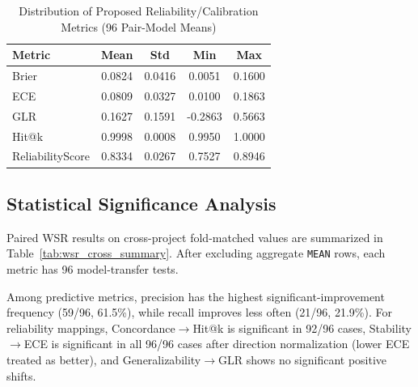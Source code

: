 \documentclass[conference]{IEEEtran}
\begin{document}
\begin{table}[t]
\caption{Distribution of Proposed Reliability/Calibration Metrics (96 Pair-Model Means)}
\label{tab:reliability_dist}
\centering
\footnotesize
\setlength{\tabcolsep}{4.0pt}
\renewcommand{\arraystretch}{1.10}
\begin{tabular}{|l|c|c|c|c|}
\hline
\textbf{Metric} & \textbf{Mean} & \textbf{Std} & \textbf{Min} & \textbf{Max} \\
\hline
Brier & 0.0824 & 0.0416 & 0.0051 & 0.1600 \\
\hline
ECE & 0.0809 & 0.0327 & 0.0100 & 0.1863 \\
\hline
GLR & 0.1627 & 0.1591 & -0.2863 & 0.5663 \\
\hline
Hit@k & 0.9998 & 0.0008 & 0.9950 & 1.0000 \\
\hline
ReliabilityScore & 0.8334 & 0.0267 & 0.7527 & 0.8946 \\
\hline
\end{tabular}
\renewcommand{\arraystretch}{1.0}
\normalsize
\end{table}

\subsection{Statistical Significance Analysis}
Paired WSR results on cross-project fold-matched values are summarized in Table~\ref{tab:wsr_cross_summary}. After excluding aggregate \texttt{MEAN} rows, each metric has 96 model-transfer tests.

Among predictive metrics, precision has the highest significant-improvement frequency (59/96, 61.5\%), while recall improves less often (21/96, 21.9\%). For reliability mappings, Concordance\(\rightarrow\)Hit@k is significant in 92/96 cases, Stability\(\rightarrow\)ECE is significant in all 96/96 cases after direction normalization (lower ECE treated as better), and Generalizability\(\rightarrow\)GLR shows no significant positive shifts.
\end{document}
